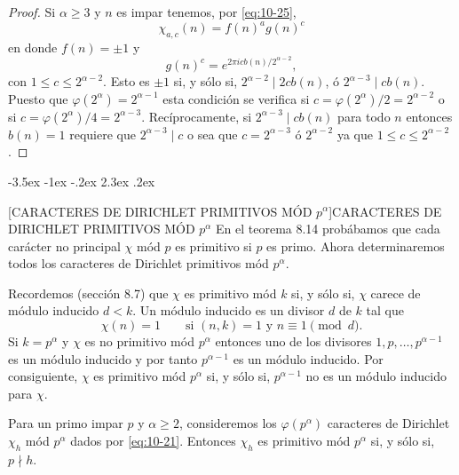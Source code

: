 \documentclass[12pt,a4paper]{book}
\makeatletter
\renewcommand\section{\@startsection{section}{1}{\z@}%
  {-3.5ex \@plus -1ex \@minus -.2ex}%
  {2.3ex \@plus .2ex}%
  {\normalfont\Large\bfseries\raggedright}}
\makeatother
\begin{document}
    \begin{proof}
        Si $\alpha\geq3$ y $n$ es impar tenemos, por \eqref{eq:10-25},
        \begin{equation*}
            \chi_{a,c}(n)=f(n)^{a}g(n)^{c}
        \end{equation*}
        en donde $f(n)=\pm1$ y
        \begin{equation*}
            g(n)^{c}=e^{2\pi icb(n)/2^{\alpha-2}},
        \end{equation*}
        con $1\leq c\leq2^{\alpha-2}$. Esto es $\pm1$ si, y sólo si, $2^{\alpha-2}\mid2cb(n)$,
        ó $2^{\alpha-3}\mid cb(n)$. Puesto que $\varphi(2^{\alpha})=2^{\alpha-1}$ esta
        condición se verifica si $c=\varphi(2^{\alpha})/2=2^{\alpha-2}$ o si
        $c=\varphi(2^{\alpha})/4=2^{\alpha-3}$. Recíprocamente, si $2^{\alpha-3}\mid cb(n)$
        para todo $n$ entonces $b(n)=1$ requiere que $2^{\alpha-3}\mid c$ o sea que
        $c=2^{\alpha-3}$ ó $2^{\alpha-2}$ ya que $1\leq c\leq2^{\alpha-2}$.
    \end{proof}

    \section[CARACTERES DE DIRICHLET PRIMITIVOS MÓD \texorpdfstring{$p^{\alpha}$}{p\textasciicircum{}α}]{CARACTERES DE DIRICHLET PRIMITIVOS MÓD \texorpdfstring{$p^{\alpha}$}{p\textasciicircum{}α}}
    En el teorema 8.14 probábamos que cada carácter no principal $\chi$ mód $p$ es primitivo
    si $p$ es primo. Ahora determinaremos todos los caracteres de Dirichlet primitivos mód
    $p^{\alpha}$.

    Recordemos (sección 8.7) que $\chi$ es primitivo mód $k$ si, y sólo si, $\chi$ carece de
    módulo inducido $d<k$. Un módulo inducido es un divisor $d$ de $k$ tal que
    \begin{equation*}
        \chi(n)=1\qquad\text{si }(n,k)=1\text{ y }n\equiv1\pmod{d}.
    \end{equation*}
    Si $k=p^{\alpha}$ y $\chi$ es no primitivo mód $p^{\alpha}$ entonces uno de los divisores
    $1,p,\dots,p^{\alpha-1}$ es un módulo inducido y por tanto $p^{\alpha-1}$ es un módulo
    inducido. Por consiguiente, $\chi$ es primitivo mód $p^{\alpha}$ si, y sólo si,
    $p^{\alpha-1}$ no es un módulo inducido para $\chi$.

    \begin{teorema}\label{teo:10-14}
        Para un primo impar $p$ y $\alpha\geq2$, consideremos los $\varphi(p^{\alpha})$
        caracteres de Dirichlet $\chi_{h}$ mód $p^{\alpha}$ dados por \eqref{eq:10-21}. Entonces
        $\chi_{h}$ es primitivo mód $p^{\alpha}$ si, y sólo si, $p\nmid h$.
    \end{teorema}
\end{document}
